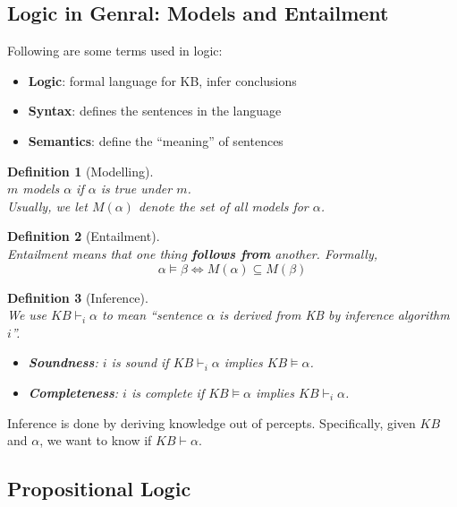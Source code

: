 \documentclass[12pt]{article}
\newtheorem{definition}{Definition}[section]
\theoremstyle{definition}
\begin{document}
\subsection{Logic in Genral: Models and Entailment}
Following are some terms used in logic:
\begin{itemize}
	\item \textbf{Logic}: formal language for KB, infer conclusions
	\item \textbf{Syntax}: defines the sentences in the language
	\item \textbf{Semantics}: define the ``meaning'' of sentences
\end{itemize}
\begin{definition}[Modelling]
\hfill\\\normalfont $m$ models $\alpha$ if $\alpha$ is true under $m$.\\
Usually, we let $M(\alpha)$ denote the set of all models for $\alpha$.
\end{definition}
\begin{definition}[Entailment]
\hfill\\\normalfont Entailment means that one thing \textbf{follows from} another. Formally,
\[
\alpha\models \beta \Leftrightarrow M(\alpha)\subseteq M(\beta)
\]
\end{definition}
\begin{definition}[Inference]
\hfill\\\normalfont We use $KB\vdash_i\alpha$ to mean ``sentence $\alpha$ is derived from KB by inference algorithm $i$''.\\
\begin{itemize}
	\item \textbf{Soundness}: $i$ is sound if $KB\vdash_i\alpha$ implies $KB\models \alpha$.
	\item \textbf{Completeness}: $i$ is complete if $KB\models \alpha$ implies $KB\vdash_i\alpha$.
\end{itemize}
\end{definition}
Inference is done by deriving knowledge out of percepts. Specifically, given $KB$ and $\alpha$, we want to know if $KB\vdash \alpha$.
\subsection{Propositional Logic}
\end{document}

